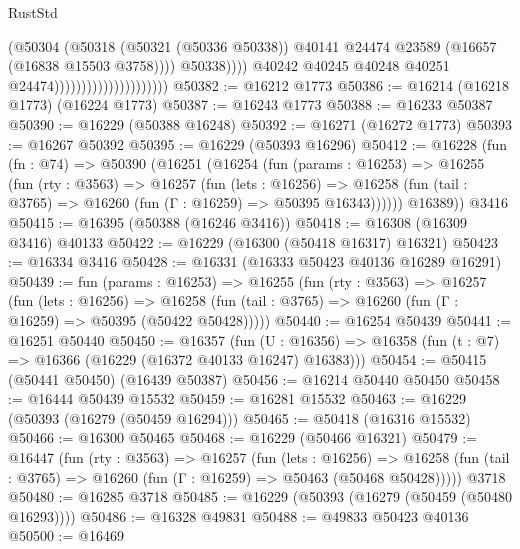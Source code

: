 \begin{lexlean}{RustStd}
\begin{coremodule}
                                                      (@50304
                                                        (@50318
                                                          (@50321 (@50336 @50338))
                                                          @40141
                                                          @24474
                                                          @23589
                                                          (@16657 (@16838 @15503 @3758))))
                                                      @50338))))
                                              @40242
                                              @40245
                                              @40248
                                              @40251
                                              @24474)))))))))))))))))))))
@50382 := @16212 @1773
@50386 := @16214 (@16218 @1773) (@16224 @1773)
@50387 := @16243 @1773
@50388 := @16233 @50387
@50390 := @16229 (@50388 @16248)
@50392 := @16271 (@16272 @1773)
@50393 := @16267 @50392
@50395 := @16229 (@50393 @16296)
@50412 := @16228
    (fun (fn : @74) =>
    @50390
      (@16251
        (@16254
          (fun (params : @16253) =>
          @16255
            (fun (rty : @3563) =>
            @16257
              (fun (lets : @16256) =>
              @16258 (fun (tail : @3765) => @16260 (fun (Γ : @16259) => @50395 @16343))))))
        @16389))
    @3416
@50415 := @16395 (@50388 (@16246 @3416))
@50418 := @16308 (@16309 @3416) @40133
@50422 := @16229 (@16300 (@50418 @16317) @16321)
@50423 := @16334 @3416
@50428 := @16331 (@16333 @50423 @40136 @16289 @16291)
@50439 := fun (params : @16253) =>
  @16255
    (fun (rty : @3563) =>
    @16257
      (fun (lets : @16256) =>
      @16258 (fun (tail : @3765) => @16260 (fun (Γ : @16259) => @50395 (@50422 @50428)))))
@50440 := @16254 @50439
@50441 := @16251 @50440
@50450 := @16357
    (fun (U : @16356) => @16358 (fun (t : @7) => @16366 (@16229 (@16372 @40133 @16247) @16383)))
@50454 := @50415 (@50441 @50450) (@16439 @50387)
@50456 := @16214 @50440 @50450
@50458 := @16444 @50439 @15532
@50459 := @16281 @15532
@50463 := @16229 (@50393 (@16279 (@50459 @16294)))
@50465 := @50418 (@16316 @15532)
@50466 := @16300 @50465
@50468 := @16229 (@50466 @16321)
@50479 := @16447
    (fun (rty : @3563) =>
    @16257
      (fun (lets : @16256) =>
      @16258 (fun (tail : @3765) => @16260 (fun (Γ : @16259) => @50463 (@50468 @50428)))))
    @3718
@50480 := @16285 @3718
@50485 := @16229 (@50393 (@16279 (@50459 (@50480 @16293))))
@50486 := @16328 @49831
@50488 := @49833 @50423 @40136
@50500 := @16469

\end{coremodule}
\end{lexlean}
